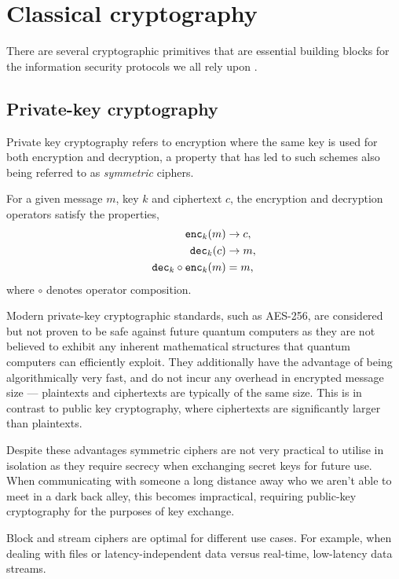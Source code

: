 \section{Classical cryptography} \label{classical-cryptography}

There are several cryptographic primitives that are essential building blocks for the information security protocols we all rely upon \cite{bib:Schneier96}.

\subsection{Private-key
cryptography} \label{private-key-cryptography}

Private key cryptography refers to encryption where the same key is used for both encryption and decryption, a property that has led to such schemes also being referred to as \emph{symmetric} ciphers.

For a given message $m$, key $k$ and ciphertext $c$, the encryption and decryption operators satisfy the properties,
\begin{align}
	{\tt enc}_k(m) &\to c, \nonumber\\
	{\tt dec}_k(c) &\to m, \nonumber\\
	{\tt dec}_k \circ {\tt enc}_k(m) &= m, 
\end{align}
where $\circ$ denotes operator composition.

Modern private-key cryptographic standards, such as AES-256, are considered but not proven to be safe against future quantum computers as they are not believed to exhibit any inherent mathematical structures that quantum computers can efficiently exploit. They additionally have the advantage of being algorithmically very fast, and do not incur any overhead in encrypted message size --- plaintexts and ciphertexts are typically of the same size. This is in contrast to public key cryptography, where ciphertexts are significantly larger than plaintexts.

Despite these advantages symmetric ciphers are not very practical to utilise in isolation as they require secrecy when exchanging secret keys for future use. When communicating with someone a long distance away who we aren't able to meet in a dark back alley, this becomes impractical, requiring public-key cryptography for the purposes of key exchange.

Block and stream ciphers are optimal for different use cases. For example, when dealing with files or latency-independent data versus real-time, low-latency data streams.

